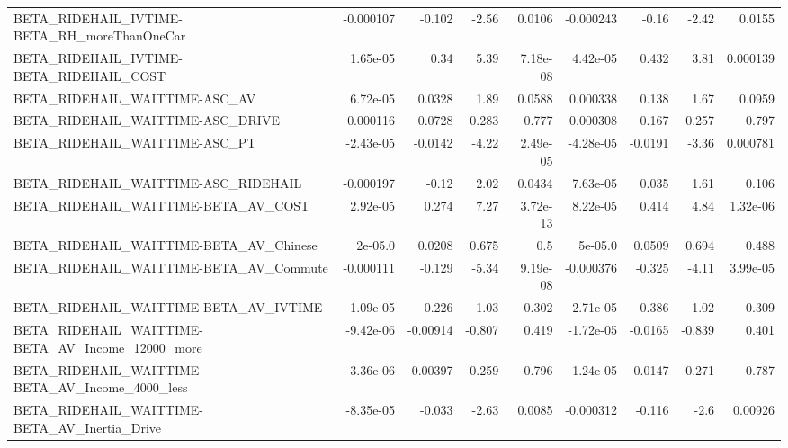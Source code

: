 \begin{tabular}{lrrrrrrrr}
BETA\_RIDEHAIL\_IVTIME-BETA\_RH\_moreThanOneCar        &   -0.000107 &       -0.102 &    -2.56 &   0.0106 &  -0.000243 &       -0.16 &        -2.42 &        0.0155 \\
BETA\_RIDEHAIL\_IVTIME-BETA\_RIDEHAIL\_COST            &    1.65e-05 &         0.34 &     5.39 & 7.18e-08 &   4.42e-05 &       0.432 &         3.81 &      0.000139 \\
BETA\_RIDEHAIL\_WAITTIME-ASC\_AV                      &    6.72e-05 &       0.0328 &     1.89 &   0.0588 &   0.000338 &       0.138 &         1.67 &        0.0959 \\
BETA\_RIDEHAIL\_WAITTIME-ASC\_DRIVE                   &    0.000116 &       0.0728 &    0.283 &    0.777 &   0.000308 &       0.167 &        0.257 &         0.797 \\
BETA\_RIDEHAIL\_WAITTIME-ASC\_PT                      &   -2.43e-05 &      -0.0142 &    -4.22 & 2.49e-05 &  -4.28e-05 &     -0.0191 &        -3.36 &      0.000781 \\
BETA\_RIDEHAIL\_WAITTIME-ASC\_RIDEHAIL                &   -0.000197 &        -0.12 &     2.02 &   0.0434 &   7.63e-05 &       0.035 &         1.61 &         0.106 \\
BETA\_RIDEHAIL\_WAITTIME-BETA\_AV\_COST                &    2.92e-05 &        0.274 &     7.27 & 3.72e-13 &   8.22e-05 &       0.414 &         4.84 &      1.32e-06 \\
BETA\_RIDEHAIL\_WAITTIME-BETA\_AV\_Chinese             &     2e-05.0 &       0.0208 &    0.675 &      0.5 &    5e-05.0 &      0.0509 &        0.694 &         0.488 \\
BETA\_RIDEHAIL\_WAITTIME-BETA\_AV\_Commute             &   -0.000111 &       -0.129 &    -5.34 & 9.19e-08 &  -0.000376 &      -0.325 &        -4.11 &      3.99e-05 \\
BETA\_RIDEHAIL\_WAITTIME-BETA\_AV\_IVTIME              &    1.09e-05 &        0.226 &     1.03 &    0.302 &   2.71e-05 &       0.386 &         1.02 &         0.309 \\
BETA\_RIDEHAIL\_WAITTIME-BETA\_AV\_Income\_12000\_more   &   -9.42e-06 &     -0.00914 &   -0.807 &    0.419 &  -1.72e-05 &     -0.0165 &       -0.839 &         0.401 \\
BETA\_RIDEHAIL\_WAITTIME-BETA\_AV\_Income\_4000\_less    &   -3.36e-06 &     -0.00397 &   -0.259 &    0.796 &  -1.24e-05 &     -0.0147 &       -0.271 &         0.787 \\
BETA\_RIDEHAIL\_WAITTIME-BETA\_AV\_Inertia\_Drive       &   -8.35e-05 &       -0.033 &    -2.63 &   0.0085 &  -0.000312 &      -0.116 &         -2.6 &       0.00926 \\

\end{tabular}
